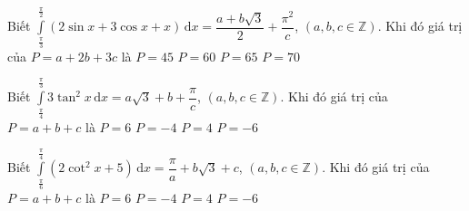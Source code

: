 \begin{ex}%
	Biết $\displaystyle\int\limits_{\tfrac{\pi}{3}}^{\tfrac{\pi}{2}}{\left(2\sin x+3\cos x+x\right)\mathrm{\,d}x}=\dfrac{a+b\sqrt{3}}{2}+\dfrac{\pi^2}{c}$, $\left(a,b,c\in\mathbb{Z}\right)$. Khi đó giá trị của $ P=a+2b+3c$ là
	\choice
	{$ P=45$}
	{\True $ P=60$}
	{$ P=65$}
	{$ P=70$}
\end{ex}

\begin{ex}%
	Biết $\displaystyle\int\limits_{\tfrac{\pi}{4}}^{\tfrac{\pi}{3}}{3\tan^2x\mathrm{\,d}x}=a\sqrt{3}+b+\dfrac{\pi}{c}$, $\left(a,b,c\in\mathbb{Z}\right)$. Khi đó giá trị của $ P=a+b+c$ là
	\choice
	{$ P=6$}
	{\True $ P=-4$}
	{$ P=4$}
	{$ P=-6$}
\end{ex}
%
\begin{ex}%
	Biết $\displaystyle\int\limits_{\tfrac{\pi}{6}}^{\tfrac{\pi}{4}}{\left(2\cot^2x+5\right)\mathrm{\,d}x}=\dfrac{\pi}{a}+b\sqrt{3}+c$, $\left(a,b,c\in\mathbb{Z}\right)$. Khi đó giá trị của \break $ P=a+b+c$ là
	\choice
	{$ P=6$}
	{$ P=-4$}
	{\True $ P=4$}
	{$ P=-6$}
\end{ex}

